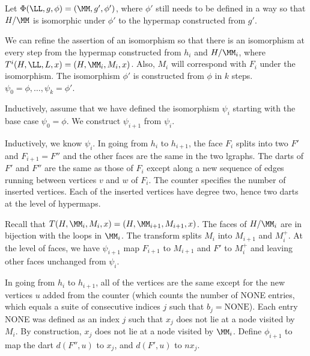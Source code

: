 Let $\Phi(\LL,g,\phi) = (\MM,g',\phi')$, where $\phi'$ still
needs to be defined in a way so that $H/\MM$ is isomorphic
under $\phi'$ to the hypermap constructed from $g'$.

We can refine the assertion of an isomorphism so that there is an
isomorphism at every step from the hypermap constructed from $h_i$ and $H/\MM_i$, where $T^i(H,\LL,L,x) = (H,\MM_i,M_i,x)$.  Also, $M_i$ will
correspond with $F_i$ under the isomorphism.  The isomorphism $\phi'$
is constructed from $\phi$ in $k$ steps.  $\psi_0 = \phi,\ldots,\psi_k
= \phi'$.


Inductively, assume that we have defined the isomorphism $\psi_i$
starting with the base case $\psi_0=\phi$.  We construct $\psi_{i+1}$
from $\psi_i$.  

Inductively, we know $\psi_i$.  In going from $h_i$ to $h_{i+1}$, the
face $F_i$ splits into two $F'$ and $F_{i+1}=F''$ and the other faces
are the same in the two lgraphs.  The darts of $F'$ and $F''$ are the
same as those of $F_i$ except along a new sequence of edges running
between vertices $v$ and $w$ of $F_i$.  The counter specifies the
number of inserted vertices.  Each of the inserted vertices have
degree two, hence two darts at the level of hypermaps.

Recall that  $T(H,\MM_i,M_i,x) = (H,\MM_{i+1},M_{i+1},x)$.  The
faces of $H/\MM_i$ are in bijection with the loops in $\MM_i$. 
The transform splits $M_i$ into $M_{i+1}$ and $M_i^+$.  At the level
of faces, we have $\psi_{i+1}$ map $F_{i+1}$ to $M_{i+1}$ and $F'$
to $M_i^+$ and leaving other faces unchanged from $\psi_i$.

In going from $h_i$ to $h_{i+1}$, all of the vertices are the same
except for the new vertices $u$ added from the counter (which counts
the number of NONE entries, which equals a suite of consecutive
indices $j$ such that $b_j = \text{NONE}$).  Each entry NONE was
defined as an index $j$ such that $x_j$ does not lie at a node visited
by $M_i$.  By construction, $x_j$ does not
lie at a node visited by $\MM_i$.  Define $\phi_{i+1}$ to map the dart
$d(F'',u)$ to $x_j$, and $d(F',u)$ to $n x_j$.

